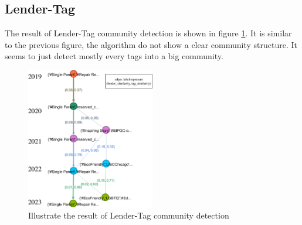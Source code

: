 \subsection{Lender-Tag}

The result of Lender-Tag community detection is shown in figure \ref{fig:LTag}.
It is similar to the previous figure, the algorithm do not show a clear community structure.
It seems to just detect mostly every tags into a big community.


\begin{figure}[H]
	\centering
	\includegraphics[width=0.5\textwidth]{images/LTag.pdf}
	\caption{Illustrate the result of Lender-Tag community detection}
	\label{fig:LTag}
\end{figure}


